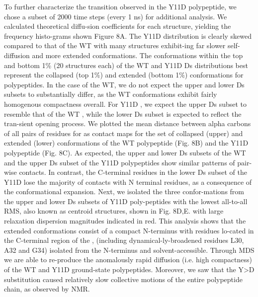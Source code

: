 	To further characterize the transition observed in the Y11D \gct{} polypeptide, we chose a subset of 2000 time steps (every 1 ns) for additional analysis.  We calculated theoretical diffu-sion coefficients for each structure, yielding the frequency histo-grams  shown Figure 8A. The Y11D \gct{} distribution is clearly skewed compared to that of the WT with many structures exhibit-ing far slower self-diffusion and more extended conformations. The conformations within the top and bottom 1\% (20 structures each) of the WT \gct{} and Y11D \gct{} Ds distributions best represent the collapsed (top 1\%) and extended (bottom 1\%) conformations for \gct{} polypeptides. In the case of the WT, we do not expect the upper and lower Ds subsets to substantially differ, as the WT \gct{} conformations exhibit fairly homogenous compactness overall. For Y11D \gct{}, we expect the upper Ds subset to resemble that of the WT \gct{}, while the lower Ds subset is expected to reflect the tran-sient opening process. We plotted the mean distance between alpha carbons of all pairs of residues for as contact maps for the set of collapsed (upper) and extended (lower) conformations of the WT \gct{} polypeptide (Fig. 8B) and the Y11D \gct{} polypeptide (Fig. 8C).   As expected, the upper and lower Ds subsets of the WT \gct{} and the upper Ds subset of the Y11D \gct{} polypeptides show similar patterns of pair-wise contacts.  In contrast, the C-terminal residues in the lower Ds subset of the Y11D \gct{} lose the majority of contacts with N terminal residues, as a consequence of the conformational expansion. Next, we isolated the three confor-mations from the upper and lower Ds subsets of  Y11D \gct{} poly-peptides with the lowest all-to-all RMS, also known as centroid structures, shown in Fig. 8D,E. with large relaxation dispersion magnitudes indicated in red. This analysis shows that the extended conformations consist of a compact N-terminus with residues lo-cated in the C-terminal region of the \gct{}, (including dynamical-ly-broadened residues L30, A32 and G34) isolated from the N-terminus and solvent-accessible. Through MDS we are able to re-produce the anomalously rapid diffusion (i.e. high compactness) of the WT and Y11D ground-state \gct{} polypeptides. Moreover, we saw that the Y>D substitution caused relatively slow collective motions of the entire polypeptide chain, as observed by NMR.
 

